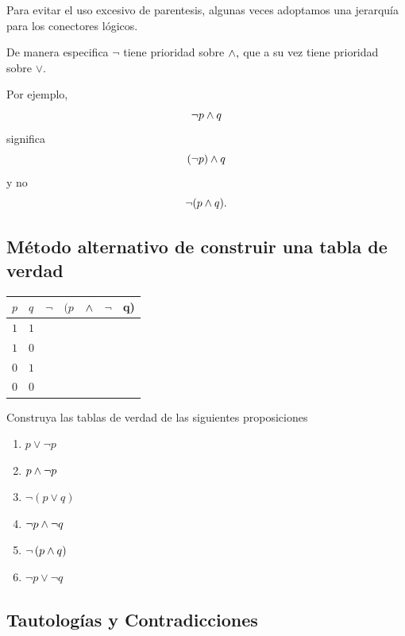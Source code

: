  \begin{rem}
  Para evitar el uso excesivo de parentesis, algunas veces adoptamos una jerarqu\'ia para los conectores l\'ogicos. 
  
  
  De manera especifica $\neg$ tiene prioridad sobre $\wedge,$ que a su vez tiene prioridad sobre $\vee$.
 \end{rem}



 Por ejemplo, $$\neg p \wedge q$$ significa $$\left( \neg p \right) \wedge q$$  y no
 $$
 \neg(p \wedge q).
 $$



 \subsection{M\'etodo alternativo de construir una tabla de verdad}
\begin{center}
\begin{tabular}{|l|l|l|l|l|l|l|}\hline
 $p$ & $q$ & $\neg$ & $(p$ & $\wedge$ & $\neg$ & q) \\\hline
 $1$ & $1$ &  &  & &  & \\\hline
 $1$ & $0$ &  &  & &  & \\\hline
 $0$ & $1$ &  &  & &  & \\\hline
 $0$ & $0$ &  &  & &  & \\\hline
\end{tabular}
\end{center}




\begin{exmp} Construya las tablas de verdad de las siguientes proposiciones
\begin{enumerate}
 \item $p\vee \neg p$
 \item $p\wedge \neg p$
 \item $\neg\left( p \vee q \right)$
 \item $\neg p \wedge \neg q$
 \item $\neg\left( p \wedge q \right)$
 \item $\neg p \vee \neg q$
\end{enumerate}


\end{exmp}




\subsection{Tautolog\'ias y Contradicciones}


